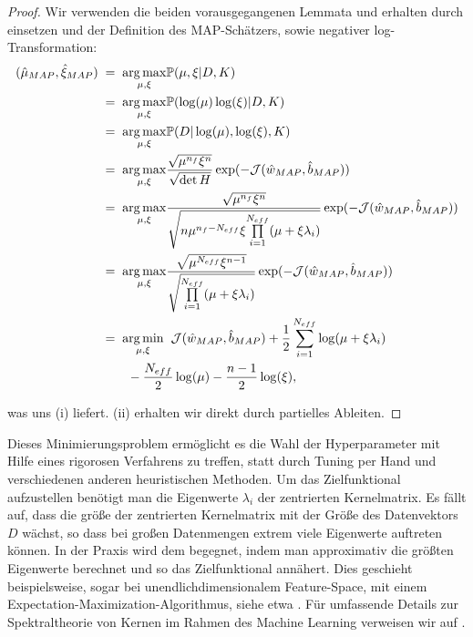 \begin{proof}
Wir verwenden die beiden vorausgegangenen Lemmata und erhalten durch einsetzen und der Definition des MAP-Schätzers, sowie negativer log-Transformation:
\begin{align*}
	(\hat{\mu}_{MAP}, \hat{\xi}_{MAP}) 
	&\;=\; \underset{\mu, \xi}{\arg \max} \mathbb{P}(\mu, \xi \vert D, K) \\
	&\;=\; \underset{\mu, \xi}{\arg \max} \mathbb{P}(\log(\mu) \log(\xi) \vert D, K) \\
	&\;=\; \underset{\mu, \xi}{\arg \max} \mathbb{P}(D \vert \log(\mu), \log(\xi), K) \\
	&\;=\; \underset{\mu, \xi}{\arg \max} \frac{\sqrt{\mu^{n_f} \xi^n}}	{\sqrt{\det H}} 				\exp(- \mathcal{J}(\hat{w}_{MAP},\hat{b}_{MAP})) \\
	&\;=\; \underset{\mu, \xi}{\arg \max} \frac{\sqrt{\mu^{n_f} \xi^n}}	{\sqrt{n \mu^{n_f - 			N_{eff}} \xi \underset{i=1}{\overset{N_{eff}}{\prod}}(\mu + 			\xi 				\lambda_i)}} \exp(- \mathcal{J}(\hat{w}_{MAP},\hat{b}_{MAP})) \\
	&\;=\; \underset{\mu, \xi}{\arg \max} \frac{\sqrt{\mu^{N_{eff}} \xi^{n-1}}}	{\sqrt{ 				\underset{i=1}{\overset{N_{eff}}{\prod}}(\mu + 	\xi	\lambda_i)}} \exp(- 					\mathcal{J}(\hat{w}_{MAP},\hat{b}_{MAP})) \\
	&\;=\; \underset{\mu, \xi}{\arg \min}  \hspace{0.2cm} \mathcal{J}(\hat{w}_{MAP}, 			   	 	\hat{b}_{MAP}) + \frac{1}{2}\sum_{i=1}^{N_{eff}}\log(\mu + \xi \lambda_i)\\
	 & \hspace{0.8cm}- \frac{N_{eff}}{2}\log(\mu) - \frac{n -1 }{2}\log(\xi),
\end{align*}

was uns (i) liefert. (ii) erhalten wir direkt durch partielles Ableiten.

\end{proof}

Dieses Minimierungsproblem ermöglicht es die Wahl der Hyperparameter mit Hilfe eines rigorosen Verfahrens zu treffen, statt durch Tuning per Hand und verschiedenen anderen heuristischen Methoden. Um das Zielfunktional aufzustellen benötigt man die Eigenwerte $\lambda_i$ der zentrierten Kernelmatrix. Es fällt auf, dass die größe der zentrierten Kernelmatrix mit der Größe des Datenvektors $D$ wächst, so dass bei großen Datenmengen extrem viele Eigenwerte auftreten können. In der Praxis wird dem begegnet, indem man approximativ die größten Eigenwerte berechnet und so das Zielfunktional annähert. Dies geschieht beispielsweise, sogar bei unendlichdimensionalem Feature-Space, mit einem Expectation-Maximization-Algorithmus, siehe etwa \cite{Kernel_PCA}. Für umfassende Details zur Spektraltheorie von Kernen im Rahmen des Machine Learning verweisen wir auf \cite{spectral_kernel}.

